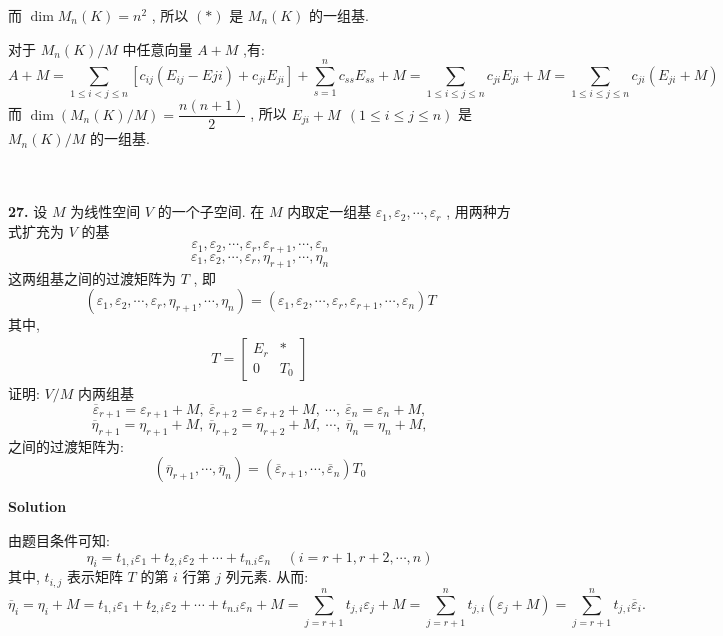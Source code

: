 \documentclass[11pt,a4paper,openany,oneside]{book}
\newcommand\Solution{\noindent\textbf{\textsf{Solution}}\par\medskip}
\begin{document}
而 $ \dim  M_n(K) = n^2 $ , 所以 $ (*) $ 是 $ M_n(K) $ 的一组基.

对于 $ M_n(K)/M $ 中任意向量 $ A + M $ ,有:
 $$  A + M = \sum\limits_{1\leq i < j \leq n} \left[ c_{ij}(E_{ij} - E{ji}) + c_{ji}E_{ji}\right] + \sum\limits_{s=1}^n c_{ss}E_{ss} + M = \sum\limits_{1 \leq i \leq j \leq n } c_{ji}E_{ji} + M  = \sum\limits_{1 \leq i \leq j \leq n} c_{ji}(E_{ji} + M)  $$ 
\hspace{1.7em} 而 $ \dim \left(M_n(K)/M \right) = \dfrac{n(n+1)}{2} $ , 所以 $ E_{ji}+M \ \ (1 \leq i \leq j \leq n) $ 是 $ M_n(K)/M $ 的一组基. \\  \\   \\

\begin{myexample}
	\textbf{27.} 
设 $ M $ 为线性空间 $ V $ 的一个子空间. 在 $ M $ 内取定一组基 $ \varepsilon_1, \varepsilon_2, \cdots, \varepsilon_r $ , 用两种方式扩充为 $ V $ 的基
 $$  \varepsilon_1, \varepsilon_2, \cdots, \varepsilon_r, \varepsilon_{r+1}, \cdots, \varepsilon_n  $$ 
 $$  \varepsilon_1, \varepsilon_2, \cdots, \varepsilon_r, \eta_{r+1}, \cdots, \eta_n  $$ 
这两组基之间的过渡矩阵为 $ T $ , 即
 $$  (\varepsilon_1, \varepsilon_2, \cdots, \varepsilon_r, \eta_{r+1}, \cdots, \eta_n) = (\varepsilon_1, \varepsilon_2, \cdots, \varepsilon_r, \varepsilon_{r+1}, \cdots, \varepsilon_n)T  $$ 
其中,
\begin{gather*}
T = 
\begin{bmatrix}
E_r  &  *  \\
0    &  T_0 
\end{bmatrix}
\end{gather*}
证明:  $ V/M $ 内两组基
 $$  \overline{\varepsilon}_{r+1} = \varepsilon_{r+1} + M,\  \overline{\varepsilon}_{r+2} = \varepsilon_{r+2} + M,\  \cdots,\  \overline{\varepsilon}_{n} = \varepsilon_{n}+ M,  $$ 
 $$  \overline{\eta}_{r+1} = \eta_{r+1} + M,\  \overline{\eta}_{r+2} = \eta_{r+2} + M,\  \cdots,\  \overline{\eta}_{n} = \eta_{n} + M,  $$ 
之间的过渡矩阵为:
 $$  (\overline{\eta}_{r+1}, \cdots, \overline{\eta}_{n}) = (\overline{\varepsilon}_{r+1}, \cdots, \overline{\varepsilon}_{n})T_0  $$  

\end{myexample}
\Solution 

由题目条件可知:
 $$  \eta_i = t_{1,i}\varepsilon_1 + t_{2,i}\varepsilon_2 + \cdots + t_{n.i}\varepsilon_n \ \ \ \ \ (i = r+1, r+2, \cdots, n) $$ 
其中,  $ t_{i,j} $ 表示矩阵 $ T $ 的第 $ i $ 行第 $ j $ 列元素. 从而:
 $$  \overline{\eta}_i = \eta_i + M =t_{1,i}\varepsilon_1 + t_{2,i}\varepsilon_2 + \cdots + t_{n.i}\varepsilon_n + M = \sum\limits_{j=r+1}^{n}t_{j,i}\varepsilon_j + M = \sum\limits_{j=r+1}^{n}t_{j,i}\left(\varepsilon_j + M \right) = \sum\limits_{j=r+1}^{n} t_{j,i}\overline{\varepsilon}_i.   $$ 
\end{document}
